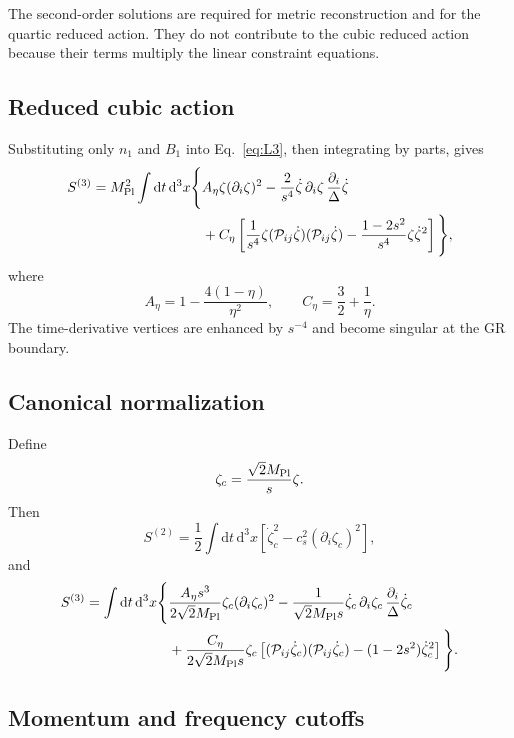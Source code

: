 \documentclass[11pt]{article}
\newcommand{\Mpl}{M_{\rm Pl}}
\newcommand{\dd}{\mathrm{d}}
\newcommand{\Del}{\Delta}
\newcommand{\cs}{c_s}
\newcommand{\Pc}{\mathcal P}
\begin{document}
The second-order solutions are required for metric reconstruction and for the quartic reduced action.  They do not contribute to the cubic reduced action because their terms multiply the linear constraint equations.

\subsection{Reduced cubic action}

Substituting only $n_1$ and $B_1$ into Eq.~\eqref{eq:L3}, then integrating by parts, gives
\begin{align}
S^{(3)}=\Mpl^2\int \dd t\,\dd^3x\Bigg\{&
A_\eta\zeta(\partial_i\zeta)^2
-\frac{2}{s^4}\dot\zeta\,\partial_i\zeta\,
\frac{\partial_i}{\Del}\dot\zeta
\nonumber\\
&+C_\eta\left[
\frac{1}{s^4}\zeta(\Pc_{ij}\dot\zeta)(\Pc_{ij}\dot\zeta)
-\frac{1-2s^2}{s^4}\zeta\dot\zeta^2\right]\Bigg\},
\label{eq:S3red}
\end{align}
where
\begin{equation}
A_\eta=1-\frac{4(1-\eta)}{\eta^2},
\qquad C_\eta=\frac32+\frac1\eta.
\label{eq:AetaCeta}
\end{equation}
The time-derivative vertices are enhanced by $s^{-4}$ and become singular at the GR boundary.

\subsection{Canonical normalization}

Define
\begin{equation}
\zeta_c=\frac{\sqrt2\Mpl}{s}\zeta.
\label{eq:canonical}
\end{equation}
Then
\begin{equation}
S^{(2)}=\frac12\int \dd t\,\dd^3x
\left[\dot\zeta_c^2-\cs^2(\partial_i\zeta_c)^2\right],
\end{equation}
and
\begin{align}
S^{(3)}=\int \dd t\,\dd^3x\Bigg\{&
\frac{A_\eta s^3}{2\sqrt2\Mpl}\zeta_c(\partial_i\zeta_c)^2
-\frac{1}{\sqrt2\Mpl s}\dot\zeta_c\,\partial_i\zeta_c\,
\frac{\partial_i}{\Del}\dot\zeta_c
\nonumber\\
&+\frac{C_\eta}{2\sqrt2\Mpl s}\zeta_c
\left[(\Pc_{ij}\dot\zeta_c)(\Pc_{ij}\dot\zeta_c)
-(1-2s^2)\dot\zeta_c^2\right]\Bigg\}.
\label{eq:S3canonical}
\end{align}

\subsection{Momentum and frequency cutoffs}
\end{document}
